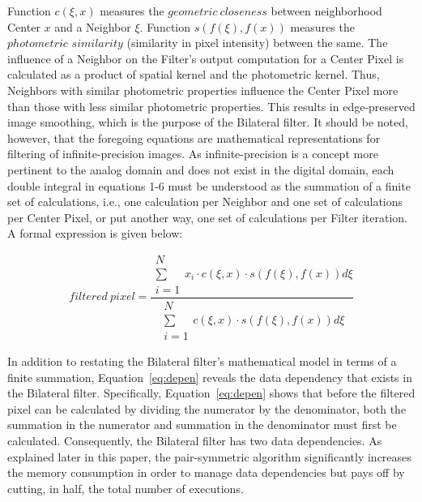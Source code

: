 \documentclass{IEEEtran}
\begin{document}
Function $c(\xi,x)$ measures the $geometric~closeness$ between neighborhood Center $x$ and a Neighbor $\xi$. Function $s(f(\xi),f(x))$ measures the $photometric$ $similarity$ (similarity in pixel intensity) between the same. The influence of a Neighbor on the Filter's output computation for a Center Pixel is calculated as a product of spatial kernel and the photometric kernel. Thus, Neighbors with similar photometric properties influence the Center Pixel more than those with less similar photometric properties. This results in edge-preserved image smoothing, which is the purpose of the Bilateral filter. It should be noted, however, that the foregoing equations are mathematical representations for filtering of infinite-precision images. As infinite-precision is a concept more pertinent to the analog domain and does not exist in the digital domain, each double integral in equations 1-6 must be understood as the summation of a finite set of calculations, i.e., one calculation per Neighbor and one set of calculations per Center Pixel, or put another way, one set of calculations per Filter iteration. A formal expression is given below:

\begin{equation}
\label{eq:depen}
filtered\: pixel=\frac{\substack{N\\
\sum\\
i=1
}
x_{i}\cdot c(\xi,x)\cdot s(f(\xi),f(x))d\xi}{\substack{N\\
\sum\\
i=1
}
c(\xi,x)\cdot s(f(\xi),f(x))d\xi}
\end{equation}

In addition to restating the Bilateral filter's mathematical model in terms of a finite summation, Equation~\ref{eq:depen} reveals the data dependency that exists in the Bilateral filter. Specifically, Equation~\ref{eq:depen} shows that before the filtered pixel can be calculated by dividing the numerator by the denominator, both the summation in the numerator and summation in the denominator must first be calculated. Consequently, the Bilateral filter has two data dependencies. As explained later in this paper, the pair-symmetric algorithm significantly increases the memory consumption in order to manage data dependencies but pays off by cutting, in half, the total number of executions.
\end{document}
